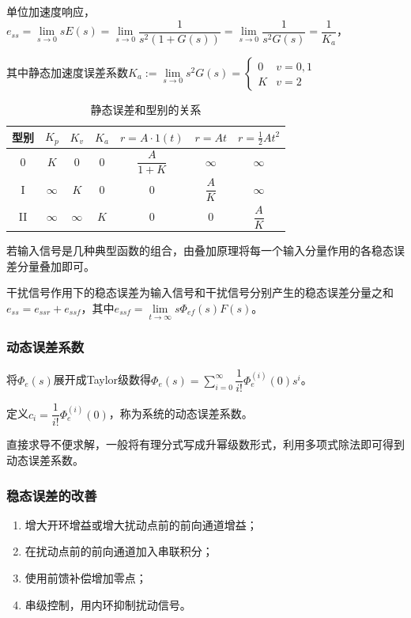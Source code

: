 \documentclass[11pt,a4paper]{ctexart}
\begin{document}
            单位加速度响应，$e_{ss}=\lim\limits_{s\rightarrow0}sE(s)=\lim\limits_{s\rightarrow0}\dfrac{1}{s^2(1+G(s))}=\lim\limits_{s\rightarrow0}\dfrac{1}{s^2G(s)}=\dfrac{1}{K_a}$，
           
            其中静态加速度误差系数$K_a:=\lim\limits_{s\rightarrow0}s^2G(s)=\begin{cases}0&v=0,1\\K&v=2\end{cases}$

            \begin{table}[H]
                \centering
                \caption{静态误差和型别的关系}
                \begin{tabular}{|c|c|c|c|c|c|c|}
                    \hline
                    型别 & $K_p$ & $K_v$ & $K_a$ & $r=A\cdot1(t)$ & $r=At$ & $r=\frac{1}{2}At^2$\\
                    \hline
                    0 & $K$ & $0$ & $0$ & $\dfrac{A}{1+K}$ & $\infty$ & $\infty$ \\
                    \hline
                    I & $\infty$ & $K$ & $0$ & $0$ & $\dfrac{A}{K}$ & $\infty$ \\
                    \hline
                    II & $\infty$ & $\infty$ & $K$ & $0$ & $0$ & $\dfrac{A}{K}$ \\
                    \hline
                \end{tabular}
            \end{table}

            若输入信号是几种典型函数的组合，由叠加原理将每一个输入分量作用的各稳态误差分量叠加即可。

            干扰信号作用下的稳态误差为输入信号和干扰信号分别产生的稳态误差分量之和$e_{ss}=e_{ssr}+e_{ssf}$，其中$e_{ssf}=\lim\limits_{t\rightarrow\infty}s\varPhi_{ef}(s)F(s)$。
        \subsubsection{动态误差系数}
            将$\varPhi_e(s)$展开成Taylor级数得$\varPhi_e(s)=\sum\limits_{i=0}^{\infty}\dfrac{1}{i!}\varPhi_e^{(i)}(0)s^i$。

            定义$c_i=\dfrac{1}{i!}\varPhi_e^{(i)}(0)$，称为系统的动态误差系数。

            直接求导不便求解，一般将有理分式写成升幂级数形式，利用多项式除法即可得到动态误差系数。
        \subsubsection{稳态误差的改善}
            \begin{enumerate}
                \item 增大开环增益或增大扰动点前的前向通道增益；
                \item 在扰动点前的前向通道加入串联积分；
                \item 使用前馈补偿增加零点；
                \item 串级控制，用内环抑制扰动信号。
            \end{enumerate}     
\newpage     
\end{document}
